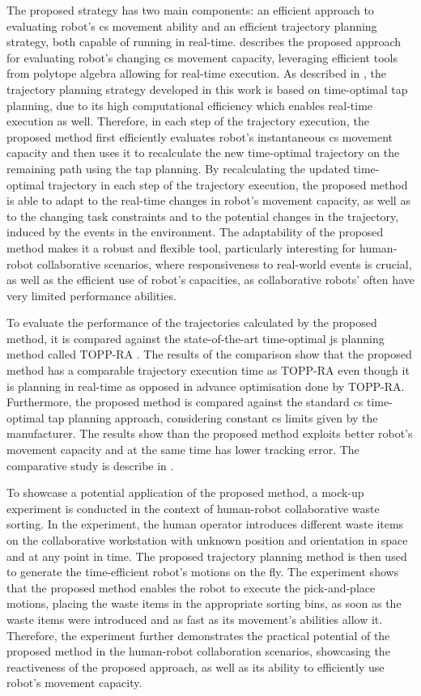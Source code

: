 The proposed strategy has two main components: an efficient approach to evaluating robot's \gls{cs} movement ability and an efficient trajectory planning strategy, both capable of running in real-time.  describes the proposed approach for evaluating robot's changing \gls{cs} movement capacity, leveraging efficient tools from polytope algebra allowing for real-time execution. As described in , the trajectory planning strategy developed in this work is based on time-optimal \gls{tap} planning, due to its high computational efficiency which enables real-time execution as well. Therefore, in each step of the trajectory execution, the proposed method first efficiently evaluates robot's instantaneous \gls{cs} movement capacity and then uses it to recalculate the new time-optimal trajectory on the remaining path using the \gls{tap} planning. 
By recalculating the updated time-optimal trajectory in each step of the trajectory execution, the proposed method is able to adapt to the real-time changes in robot's movement capacity, as well as to the changing task constraints and to the potential changes in the trajectory, induced by the events in the environment. 
The adaptability of the proposed method makes it a robust and flexible tool, particularly interesting for human-robot collaborative scenarios, where responsiveness to real-world events is crucial, as well as the efficient use of robot's capacities, as collaborative robots' often have very limited performance abilities. 

To evaluate the performance of the trajectories calculated by the proposed method, it is compared against the state-of-the-art time-optimal \gls{js} planning method called TOPP-RA \cite{Pham2018}. The results of the comparison show that the proposed method has a comparable trajectory execution time as TOPP-RA even though it is planning in real-time as opposed in advance optimisation done by TOPP-RA.
Furthermore, the proposed method is compared against the standard \gls{cs} time-optimal \gls{tap} planning approach, considering constant \gls{cs} limits given by the manufacturer. The results show than the proposed method exploits better robot's movement capacity and at the same time has lower tracking error. The comparative study is describe in .

To showcase a potential application of the proposed method, a mock-up experiment is conducted in the context of human-robot collaborative waste sorting. In the experiment, the human operator introduces different waste items on the collaborative workstation with unknown position and orientation in space and at any point in time. The proposed trajectory planning method is then used to generate the time-efficient robot's motions on the fly. The experiment shows that the proposed method enables the robot to execute the pick-and-place motions, placing the waste items in the appropriate sorting bins, as soon as the waste items were introduced and as fast as its movement's abilities allow it. Therefore, the experiment further demonstrates the practical potential of the proposed method in the human-robot collaboration scenarios, showcasing the reactiveness of the proposed approach, as well as its ability to efficiently use robot's movement capacity. 

